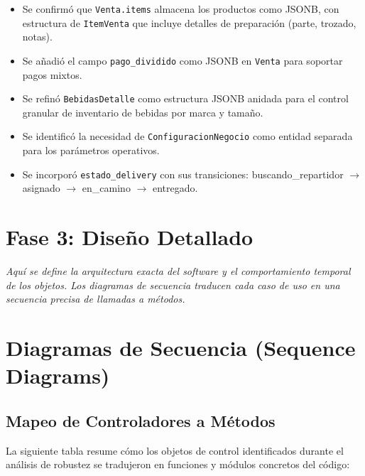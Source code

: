 \documentclass[12pt, a4paper]{article}
\begin{document}
\begin{itemize}[leftmargin=2cm]
    \item Se confirmó que \texttt{Venta.items} almacena los productos como JSONB, con estructura de \texttt{ItemVenta} que incluye detalles de preparación (parte, trozado, notas).
    \item Se añadió el campo \texttt{pago\_dividido} como JSONB en \texttt{Venta} para soportar pagos mixtos.
    \item Se refinó \texttt{BebidasDetalle} como estructura JSONB anidada para el control granular de inventario de bebidas por marca y tamaño.
    \item Se identificó la necesidad de \texttt{ConfiguracionNegocio} como entidad separada para los parámetros operativos.
    \item Se incorporó \texttt{estado\_delivery} con sus transiciones: buscando\_repartidor $\rightarrow$ asignado $\rightarrow$ en\_camino $\rightarrow$ entregado.
\end{itemize}

\newpage
\section*{Fase 3: Diseño Detallado}

\textit{Aquí se define la arquitectura exacta del software y el comportamiento temporal de los objetos. Los diagramas de secuencia traducen cada caso de uso en una secuencia precisa de llamadas a métodos.}

\section{Diagramas de Secuencia (Sequence Diagrams)}

\subsection{Mapeo de Controladores a Métodos}

La siguiente tabla resume cómo los objetos de control identificados durante el análisis de robustez se tradujeron en funciones y módulos concretos del código:
\end{document}
